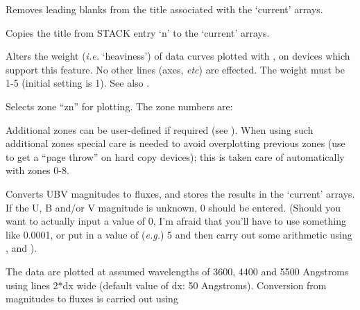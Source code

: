 \begin {description}
Removes leading blanks from the title associated with the `current' arrays.

Copies the title from STACK entry `n' to the `current' arrays.

Alters the weight ({\em i.e.} `heaviness') of data curves plotted with
,  on devices which support this feature. No other lines (axes, {\em
etc}) are effected. The weight must be 1-5 (initial setting is 1). See
also . 

Selects zone ``zn'' for plotting. The zone numbers are:

\begin{quote}
\begin{dipdesc}
\end{dipdesc}
\end{quote}

Additional zones can be user-defined if required (see ).  When
using such additional zones special care is needed to avoid
overplotting previous zones (use   to get a ``page throw'' on hard
copy devices); this is taken care of automatically with zones 0-8.

Converts UBV magnitudes to fluxes, and stores the results in the
`current' arrays. If the U, B and/or V magnitude is unknown, 0 should
be entered. (Should you want to actually input a value of 0, I'm
afraid that you'll have to use something like 0.0001, or put in a
value of ({\em e.g.}) 5 and then carry out some arithmetic using , 
  and ). 

The data are plotted at assumed wavelengths of 3600, 4400 and 5500
Angstroms using lines 2*dx wide (default value of dx: 50 Angstroms).
Conversion from magnitudes to fluxes is carried out using


\end{description}

